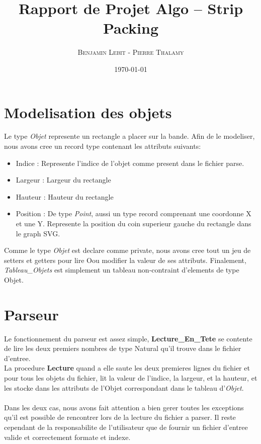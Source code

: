 \documentclass{article}
\title{Rapport de Projet Algo -- Strip Packing}
\author{\textsc{Benjamin Lebit} - \textsc{Pierre Thalamy}}
\date{\today}
\begin{document}
\maketitle

\section {Modelisation des objets}
Le type \textit{Objet} represente un rectangle a placer sur la bande. 
Afin de le modeliser, nous avons cree un record type contenant 
les attributs suivants:
\begin{itemize}
  \item Indice : Represente l'indice de l'objet comme present dans le fichier 
    parse.
  \item Largeur : Largeur du rectangle
  \item Hauteur : Hauteur du rectangle
  \item Position : De type \textit{Point}, aussi un type record comprenant une 
    coordonne X et une Y. 
    Represente la position du coin superieur gauche du rectangle dans le graph SVG.
\end{itemize}

Comme le type \textit{Objet} est declare comme private, nous avons cree tout un jeu de setters et getters pour lire Oou modifier la valeur de ses attributs.
Finalement, \textit{Tableau\_Objets} est simplement un tableau non-contraint d'elements de type Objet.

\section {Parseur}
Le fonctionnement du parseur est assez simple, \textbf{Lecture\_En\_Tete} se contente de lire les deux premiers nombres de type Natural qu'il trouve dans le fichier d'entree. \\
La procedure \textbf{Lecture} quand a elle saute les deux premieres lignes du fichier et pour tous les objets du fichier, lit la valeur de l'indice, la largeur, et la hauteur, et les stocke dans les attributs de l'Objet correspondant dans le tableau 
d'\textit{Objet}.
\paragraph{} Dans les deux cas, nous avons fait attention a bien gerer toutes les exceptions qu'il est possible de rencontrer lors de la lecture du fichier a parser. Il reste cependant de la responsabilite de l'utilisateur que de fournir un fichier d'entree valide et correctement formate et indexe.
\newpage
\end{document}
